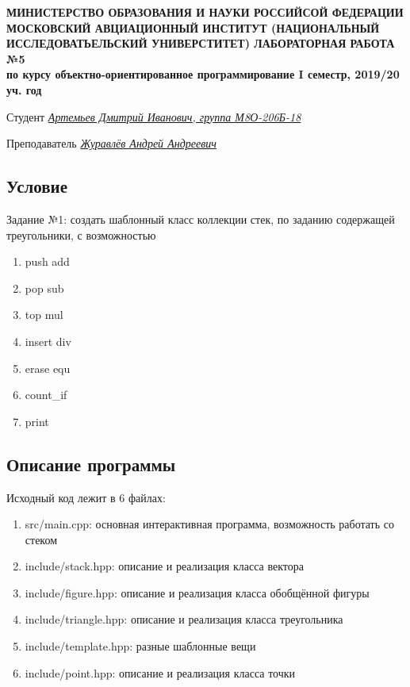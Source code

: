 \documentclass[12pt]{article}
\begin{document}
\begin{titlepage}
\begin{center}
\textbf{МИНИСТЕРСТВО ОБРАЗОВАНИЯ И НАУКИ РОССИЙСОЙ ФЕДЕРАЦИИ
\medskip
МОСКОВСКИЙ АВЦИАЦИОННЫЙ ИНСТИТУТ
(НАЦИОНАЛЬНЫЙ ИССЛЕДОВАТЬЕЛЬСКИЙ УНИВЕРСТИТЕТ)
\vfill\vfill
{\Huge ЛАБОРАТОРНАЯ РАБОТА №5} \\
по курсу объектно-ориентированное программирование
I семестр, 2019/20 уч. год}
\end{center}
\vfill

Студент \uline{\it {Артемьев Дмитрий Иванович, группа М8О-206Б-18}\hfill}

Преподаватель \uline{\it {Журавлёв Андрей Андреевич}\hfill}

\vfill
\end{titlepage}

\subsection*{Условие}

Задание №1: создать шаблонный класс коллекции стек, по заданию содержащей треугольники, с возможностью
\begin{enumerate}
\item push add
\item pop sub
\item top mul
\item insert div
\item erase equ
\item count\_if
\item print
\end{enumerate}

\subsection*{Описание программы}

Исходный код лежит в 6 файлах:
\begin{enumerate}
\item src/main.cpp: основная интерактивная программа, возможность работать со стеком
\item include/stack.hpp: описание и реализация класса вектора
\item include/figure.hpp: описание и реализация класса обобщённой фигуры
\item include/triangle.hpp: описание и реализация класса треугольника
\item include/template.hpp: разные шаблонные вещи
\item include/point.hpp: описание и реализация класса точки
  
\end{enumerate}
\end{document}
